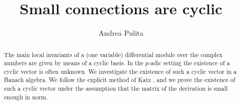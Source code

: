 \documentclass{compositio}
\numberwithin{equation}{section}
\begin{document}
\title[Small connections are cyclic]{Small connections are 
cyclic}

\author{Andrea Pulita}


\address{Departement de Mathématique, 
Université de Montpellier II, Bat 9, CC051, 
Place Eugène Bataillon, 34095 
Montpellier Cedex 05, France.}

 

\begin{abstract}
The main local invariants of a (one variable) differential 
module over the complex numbers are given by means of 
a cyclic basis. In the $p$-adic setting the existence of a 
cyclic vector is often unknown. 
We investigate the existence of such a cyclic vector in a 
Banach algebra. We follow the explicit method of 
Katz \cite{Katz-cyclic}, and we prove 
the existence of such a cyclic vector under the assumption 
that the matrix of the derivation is small enough in norm.
\fi 
\end{abstract}

\maketitle

\makeatletter

\makeatother

\setcounter{tocdepth}{3} {    \subsection*{\contentsname}        }

\setcounter{section}{0}
\end{document}
